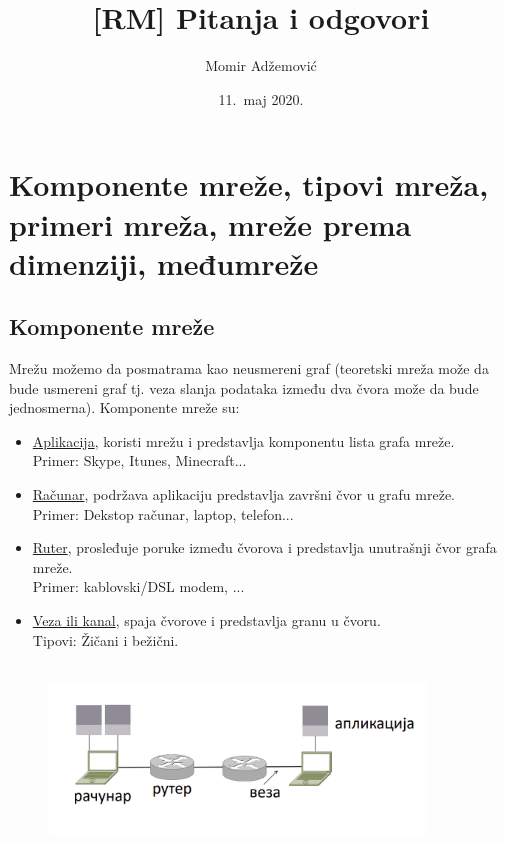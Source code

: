 \documentclass[a4paper]{article}
\begin{document}
\title{[RM] Pitanja i odgovori}

\author{Momir Adžemović}

\date{11.~maj 2020.}

\maketitle

\tableofcontents

\newpage

\section{Komponente mreže, tipovi mreža, primeri mreža, mreže prema dimenziji, međumreže}
    \subsection{Komponente mreže}
        Mrežu možemo da posmatrama kao neusmereni graf (teoretski mreža može da bude usmereni graf tj.
        veza slanja podataka između dva čvora može da bude jednosmerna). Komponente mreže su:
        \begin{itemize}
            \item \underline{Aplikacija}, koristi mrežu i predstavlja komponentu lista grafa mreže.\\
                  Primer: Skype, Itunes, Minecraft...
            \item \underline{Računar}, podržava aplikaciju predstavlja završni čvor u grafu mreže.\\
                  Primer: Dekstop računar, laptop, telefon...
            \item \underline{Ruter}, prosleđuje poruke između čvorova i predstavlja unutrašnji čvor grafa mreže.\\
                  Primer: kablovski/DSL modem, ...
            \item \underline{Veza ili kanal}, spaja čvorove i predstavlja granu u čvoru.\\
                  Tipovi: Žičani i bežični.
        \end{itemize}
        \begin{figure}[H]
            \begin{center}
                \includegraphics[width=100mm,height=50mm]{Slike/komponente_mreze.png}
            \end{center}
        \end{figure}
\end{document}
